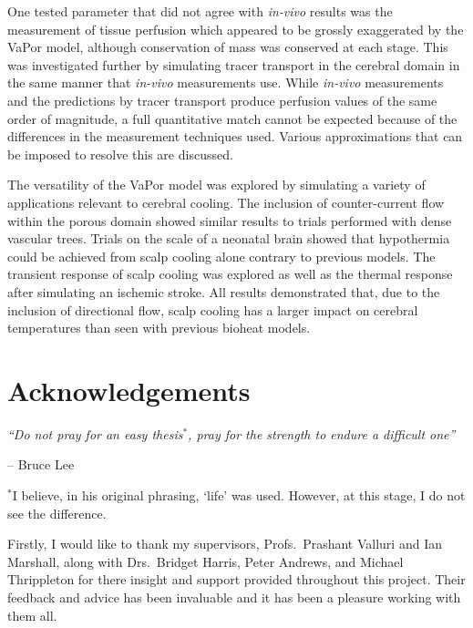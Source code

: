 \documentclass[11pt,english,a4paper,twoside,openright]{report}
\begin{document}
{{	One tested parameter that did not agree with \textit{in-vivo} results was the measurement of tissue perfusion which appeared to be grossly exaggerated by the VaPor model, although conservation of mass was conserved at each stage. This was investigated further by simulating tracer transport in the cerebral domain in the same manner that \textit{in-vivo} measurements use. While \textit{in-vivo} measurements and the predictions by tracer transport produce perfusion values of the same order of magnitude, a full quantitative match cannot be expected because of the differences in the measurement techniques used. Various approximations that can be imposed to resolve this are discussed.
	
	The versatility of the VaPor model was explored by simulating a variety of applications relevant to cerebral cooling. The inclusion of counter-current flow within the porous domain showed similar results to trials performed with dense vascular trees. Trials on the scale of a neonatal brain showed that hypothermia could be achieved from scalp cooling alone contrary to previous models. The transient response of scalp cooling was explored as well as the thermal response after simulating an ischemic stroke. All results demonstrated that, due to the inclusion of directional flow, scalp cooling has a larger impact on cerebral temperatures than seen with previous bioheat models. 
	
	
	\chapter*{{\Huge A}cknowledgements}
	
	\begin{flushright}
		\parbox{0.7\textwidth}{\flushright\textit{``Do not pray for an easy thesis}$^{*}$\textit{, pray for the strength to endure a difficult one'' \qquad\qquad\qquad}}
		
		-- Bruce Lee
		
		\parbox{\textwidth}{\flushright\scriptsize{$^{*}$I believe, in his original phrasing, `life' was used. However, at this stage, I do not see the difference.}}
	\end{flushright}
	
	\bigskip
	\bigskip
	\medskip
	
	Firstly, I would like to thank my supervisors, Profs.\ Prashant Valluri and Ian Marshall, along with Drs.\  Bridget Harris, Peter Andrews, and Michael Thrippleton for there insight and support provided throughout this project. Their feedback and advice has been invaluable and it has been a pleasure working with them all.
	
}}
\end{document}
